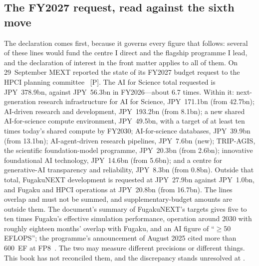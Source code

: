 \subsection{The FY2027 request, read against the sixth move}
\label{sec:gov-japan-request}

The declaration comes first, because it governs every figure that follows: several of these lines would fund the centre I direct and the flagship programme I lead, and the declaration of interest in the front matter applies to all of them. On 29~September MEXT reported the state of its FY2027 budget request to the HPCI planning committee~\cite{gov-mext-fy2027} [P]. The AI for Science total requested is JPY~378.9bn, against JPY~56.3bn in FY2026---about 6.7 times. Within it: next-generation research infrastructure for AI for Science, JPY~171.1bn (from 42.7bn); AI-driven research and development, JPY~193.2bn (from 8.1bn); a new shared AI-for-science compute environment, JPY~49.5bn, with a target of at least ten times today's shared compute by FY2030; AI-for-science databases, JPY~39.9bn (from 13.1bn); AI-agent-driven research pipelines, JPY~7.6bn (new); TRIP-AGIS, the scientific foundation-model programme, JPY~20.3bn (from 2.6bn); innovative foundational AI technology, JPY~14.6bn (from 5.6bn); and a centre for generative-AI transparency and reliability, JPY~8.3bn (from 0.8bn). Outside that total, FugakuNEXT development is requested at JPY~27.9bn against JPY~1.0bn, and Fugaku and HPCI operations at JPY~20.8bn (from 16.7bn). The lines overlap and must not be summed, and supplementary-budget amounts are outside them. The document's summary of FugakuNEXT's targets gives five to ten times Fugaku's effective simulation performance, operation around 2030 with roughly eighteen months' overlap with Fugaku, and an AI figure of ``$\geq$50 EFLOPS''; the programme's announcement of August 2025 cited more than 600~EF at FP8~\cite{fugakunext}. The two may measure different precisions or different things. This book has not reconciled them, and the discrepancy stands unresolved at \datafreeze.

